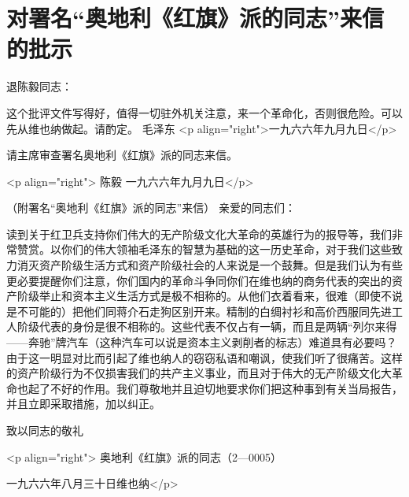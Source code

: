\section[对署名“奥地利《红旗》派的同志”来信的批示（一九六六年九月九日）]{对署名“奥地利《红旗》派的同志”来信的批示}


退陈毅同志：

这个批评文件写得好，值得一切驻外机关注意，来一个革命化，否则很危险。可以先从维也纳做起。请酌定。
毛泽东
<p align="right">一九六六年九月九日</p>

请主席审查署名奥地利《红旗》派的同志来信。

<p align="right"> 陈毅
一九六六年九月九日</p>

（附署名“奥地利《红旗》派的同志”来信）
亲爱的同志们：

读到关于红卫兵支持你们伟大的无产阶级文化大革命的英雄行为的报导等，我们非常赞赏。以你们的伟大领袖毛泽东的智慧为基础的这一历史革命，对于我们这些致力消灭资产阶级生活方式和资产阶级社会的人来说是一个鼓舞。但是我们认为有些更必要提醒你们注意，你们国内的革命斗争同你们在维也纳的商务代表的突出的资产阶级举止和资本主义生活方式是极不相称的。从他们衣着看来，很难（即使不说是不可能的）把他们同蒋介石走狗区别开来。精制的白绸衬衫和高价西服同先进工人阶级代表的身份是很不相称的。这些代表不仅占有一辆，而且是两辆“列尔来得——奔驰”牌汽车（这种汽车可以说是资本主义剥削者的标志）难道具有必要吗？由于这一明显对比而引起了维也纳人的窃窃私语和嘲讽，使我们听了很痛苦。这样的资产阶级行为不仅损害我们的共产主义事业，而且对于伟大的无产阶级文化大革命也起了不好的作用。我们尊敬地并且迫切地要求你们把这种事到有关当局报告，并且立即采取措施，加以纠正。

致以同志的敬礼

<p align="right"> 奥地利《红旗》派的同志（2—0005）

 一九六六年八月三十日维也纳</p>


